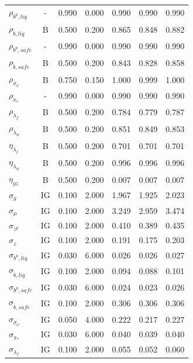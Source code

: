 \documentclass[12pt]{article}
\begin{document}
{\begin{longtable}{lcccccc}
$\rho_{b^p,liq}$ & - &    0.990 &    0.000 &    0.990 &    0.990 &    0.990 \\
$\rho_{\tilde{b},liq}$ & B &    0.500 &    0.200 &    0.865 &    0.848 &    0.882 \\
$\rho_{b^p,safe}$ & - &    0.990 &    0.000 &    0.990 &    0.990 &    0.990 \\
$\rho_{\tilde{b},safe}$ & B &    0.500 &    0.200 &    0.843 &    0.828 &    0.858 \\
$\rho_{\sigma_\omega}$ & B &    0.750 &    0.150 &    1.000 &    0.999 &    1.000 \\
$\rho_{\pi_*}$ & - &    0.990 &    0.000 &    0.990 &    0.990 &    0.990 \\
$\rho_{\lambda_f}$ & B &    0.500 &    0.200 &    0.784 &    0.779 &    0.787 \\
$\rho_{\lambda_w}$ & B &    0.500 &    0.200 &    0.851 &    0.849 &    0.853 \\
$\eta_{\lambda_f}$ & B &    0.500 &    0.200 &    0.701 &    0.701 &    0.701 \\
$\eta_{\lambda_w}$ & B &    0.500 &    0.200 &    0.996 &    0.996 &    0.996 \\
$\eta_{gz}$ & B &    0.500 &    0.200 &    0.007 &    0.007 &    0.007 \\
$\sigma_{g}$ & IG &    0.100 &    2.000 &    1.967 &    1.925 &    2.023 \\
$\sigma_{\mu}$ & IG &    0.100 &    2.000 &    3.249 &    2.959 &    3.474 \\
$\sigma_{z^p}$ & IG &    0.100 &    2.000 &    0.410 &    0.389 &    0.435 \\
$\sigma_{z}$ & IG &    0.100 &    2.000 &    0.191 &    0.175 &    0.203 \\
$\sigma_{b^p, liq}$ & IG &    0.030 &    6.000 &    0.026 &    0.026 &    0.027 \\
$\sigma_{\tilde{b}, liq}$ & IG &    0.100 &    2.000 &    0.094 &    0.088 &    0.101 \\
$\sigma_{b^p, safe}$ & IG &    0.030 &    6.000 &    0.024 &    0.023 &    0.026 \\
$\sigma_{\tilde{b}, safe}$ & IG &    0.100 &    2.000 &    0.306 &    0.306 &    0.306 \\
$\sigma_{\sigma_\omega}$ & IG &    0.050 &    4.000 &    0.222 &    0.217 &    0.227 \\
$\sigma_{\pi_*}$ & IG &    0.030 &    6.000 &    0.040 &    0.039 &    0.040 \\
$\sigma_{\lambda_f}$ & IG &    0.100 &    2.000 &    0.055 &    0.052 &    0.060 \\

\end{longtable}}
\end{document}
